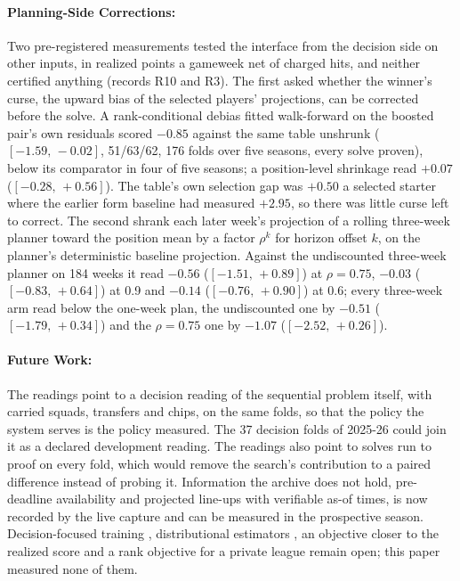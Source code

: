 \documentclass[11pt,a4paper]{article}
\newcommand{\ci}[2]{$[#1,\,#2]$}
\begin{document}
\paragraph{Planning-Side Corrections:} Two pre-registered measurements tested the interface from the decision side on other inputs, in realized points a gameweek net of charged hits, and neither certified anything (records R10 and R3). The first asked whether the winner's curse, the upward bias of the selected players' projections, can be corrected before the solve. A rank-conditional debias fitted walk-forward on the boosted pair's own residuals scored $-0.85$ against the same table unshrunk (\ci{-1.59}{-0.02}, 51/63/62, 176 folds over five seasons, every solve proven), below its comparator in four of five seasons; a position-level shrinkage read $+0.07$ (\ci{-0.28}{+0.56}). The table's own selection gap was $+0.50$ a selected starter where the earlier form baseline had measured $+2.95$, so there was little curse left to correct. The second shrank each later week's projection of a rolling three-week planner toward the position mean by a factor $\rho^{k}$ for horizon offset $k$, on the planner's deterministic baseline projection. Against the undiscounted three-week planner on 184 weeks it read $-0.56$ (\ci{-1.51}{+0.89}) at $\rho = 0.75$, $-0.03$ (\ci{-0.83}{+0.64}) at 0.9 and $-0.14$ (\ci{-0.76}{+0.90}) at 0.6; every three-week arm read below the one-week plan, the undiscounted one by $-0.51$ (\ci{-1.79}{+0.34}) and the $\rho = 0.75$ one by $-1.07$ (\ci{-2.52}{+0.26}).

\paragraph{Future Work:} The readings point to a decision reading of the sequential problem itself, with carried squads, transfers and chips, on the same folds, so that the policy the system serves is the policy measured. The 37 decision folds of 2025-26 could join it as a declared development reading. The readings also point to solves run to proof on every fold, which would remove the search's contribution to a paired difference instead of probing it. Information the archive does not hold, pre-deadline availability and projected line-ups with verifiable as-of times, is now recorded by the live capture and can be measured in the prospective season. Decision-focused training \cite{elmachtoub2022}, distributional estimators \cite{duan2020}, an objective closer to the realized score and a rank objective for a private league remain open; this paper measured none of them.
\end{document}
